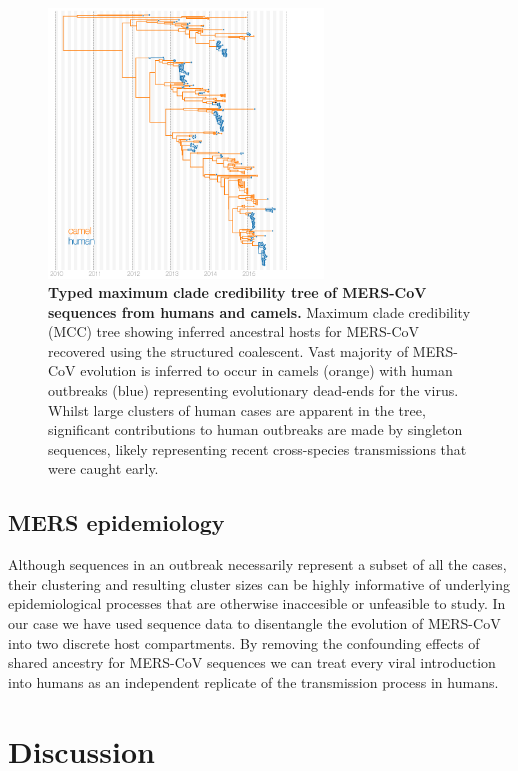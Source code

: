 \documentclass[11pt,oneside,letterpaper]{article}
\begin{document}
\begin{figure}[h]
 \centering		
	\includegraphics[width=0.65\textwidth]{figures/mers_mcc.png}
	\caption{\textbf{Typed maximum clade credibility tree of MERS-CoV sequences from humans and camels.}
	Maximum clade credibility (MCC) tree showing inferred ancestral hosts for MERS-CoV recovered using the structured coalescent.
	Vast majority of MERS-CoV evolution is inferred to occur in camels (orange) with human outbreaks (blue) representing evolutionary dead-ends for the virus.
	Whilst large clusters of human cases are apparent in the tree, significant contributions to human outbreaks are made by singleton sequences, likely representing recent cross-species transmissions that were caught early. 
	}
	\label{mcc}
\end{figure}

\subsection*{MERS epidemiology}
Although sequences in an outbreak necessarily represent a subset of all the cases, their clustering and resulting cluster sizes can be highly informative of underlying epidemiological processes that are otherwise inaccesible or unfeasible to study.
In our case we have used sequence data to disentangle the evolution of MERS-CoV into two discrete host compartments.
By removing the confounding effects of shared ancestry for MERS-CoV sequences we can treat every viral introduction into humans as an independent replicate of the transmission process in humans.


\section*{Discussion}
\end{document}
